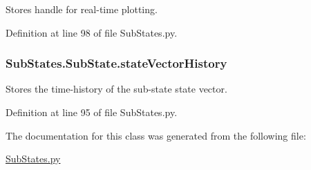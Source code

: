 Stores handle for real-\/time plotting. 



Definition at line 98 of file Sub\+States.\+py.

\subsubsection[{\texorpdfstring{state\+Vector\+History}{stateVectorHistory}}]{\setlength{\rightskip}{0pt plus 5cm}Sub\+States.\+Sub\+State.\+state\+Vector\+History}\hypertarget{classSubStates_1_1SubState_a24bf2de56fc3037d91cba43d28f3bf60}{}\label{classSubStates_1_1SubState_a24bf2de56fc3037d91cba43d28f3bf60}


Stores the time-\/history of the sub-\/state state vector. 



Definition at line 95 of file Sub\+States.\+py.



The documentation for this class was generated from the following file\+:\begin{DoxyCompactItemize}
\item 
\hyperlink{SubStates_8py}{Sub\+States.\+py}\end{DoxyCompactItemize}
